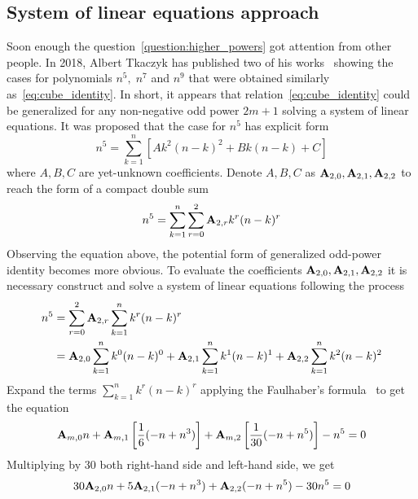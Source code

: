 \subsection{System of linear equations approach}\label{subsec:system-of-linear-equations-approach}
Soon enough the question~\eqref{question:higher_powers} got attention from other people.
In 2018, Albert Tkaczyk has published two of his works~\cite{tkaczyk2018problem, tkaczyk2018continuation}
showing the cases for polynomials $n^5, \; n^7$ and $n^9$ that were obtained similarly as~\eqref{eq:cube_identity}.
In short, it appears that relation~\eqref{eq:cube_identity} could be generalized
for any non-negative odd power $2m+1$ solving a system of linear equations.
It was proposed that the case for $n^5$ has explicit form
\begin{equation*}
    n^5 = \sum_{k=1}^{n} \left[ A k^2(n-k)^2 + Bk(n-k) + C \right]
\end{equation*}
where $A,B,C$ are yet-unknown coefficients.
Denote $A,B,C$ as ${\mathbf{A}} \sb{2,0}, {\mathbf{A}} \sb{2,1}, {\mathbf{A}} \sb{2,2}$
to reach the form of a compact double sum
\begin{equation*}
    n^5 = \sum_{k=1}^{n} \sum_{r=0}^{2} {\mathbf{A}} \sb{2,r} k^r (n-k)^r
\end{equation*}
Observing the equation above, the potential form of generalized odd-power identity becomes more obvious.
To evaluate the coefficients ${\mathbf{A}} \sb{2,0}, {\mathbf{A}} \sb{2,1}, {\mathbf{A}} \sb{2,2}$
it is necessary construct and solve a system of linear equations following the process
\begin{equation*}
    \begin{split}
        n^5 &= \sum_{r=0}^{2} {\mathbf{A}} \sb{2,r} \sum_{k=1}^{n} k^r (n-k)^r \\
        &= {\mathbf{A}} \sb{2,0} \sum_{k=1}^{n} k^0 (n-k)^0 + {\mathbf{A}} \sb{2,1} \sum_{k=1}^{n} k^1 (n-k)^1 + {\mathbf{A}} \sb{2,2} \sum_{k=1}^{n} k^2 (n-k)^2
    \end{split}
\end{equation*}
Expand the terms $\sum_{k=1}^{n} k^r (n-k)^r$ applying the
Faulhaber's formula~\cite{beardon1996sums}
to get the equation
\begin{equation*}
    {\mathbf{A}} \sb{m,0} n
    + {\mathbf{A}} \sb{m,1} \left[ \frac{1}{6} (-n + n^3) \right]
    + {\mathbf{A}} \sb{m,2} \left[ \frac{1}{30} (-n + n^5) \right] - n^5 = 0
\end{equation*}
Multiplying by $30$ both right-hand side and left-hand side, we get
\begin{equation*}
    30 {\mathbf{A}} \sb{2,0} n + 5 {\mathbf{A}} \sb{2,1} (-n + n^3) + {\mathbf{A}} \sb{2,2} (-n + n^5) - 30n^5 = 0
\end{equation*}
